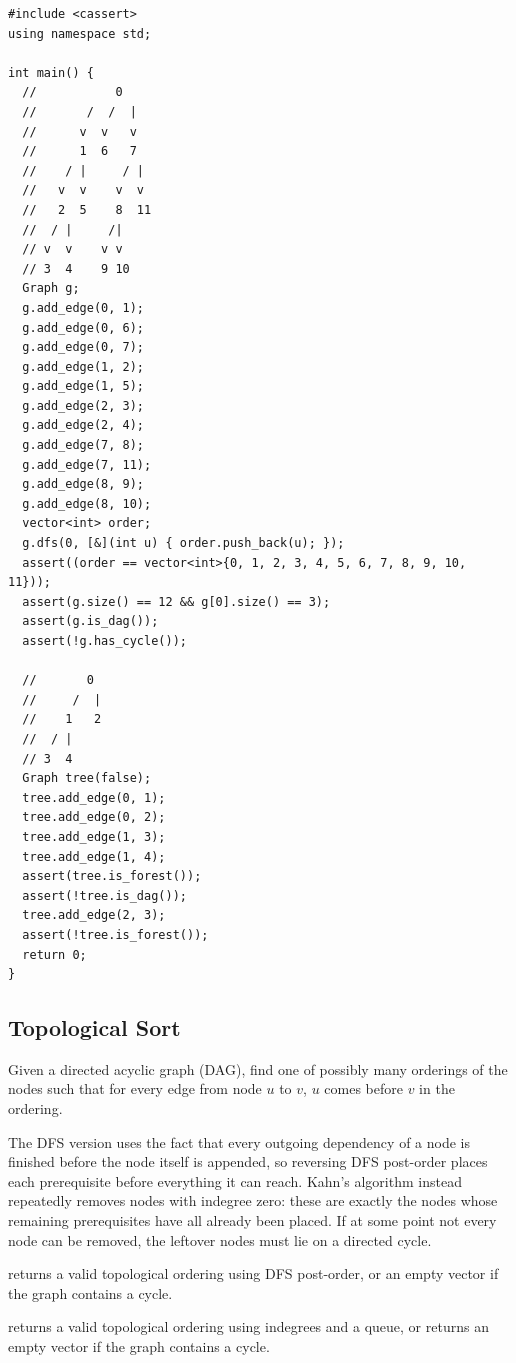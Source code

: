 \begin{lstlisting}[style=cpp]
#include <cassert>
using namespace std;

int main() {
  //           0
  //       /  /  |
  //      v  v   v
  //      1  6   7
  //    / |     / |
  //   v  v    v  v
  //   2  5    8  11
  //  / |     /|
  // v  v    v v
  // 3  4    9 10
  Graph g;
  g.add_edge(0, 1);
  g.add_edge(0, 6);
  g.add_edge(0, 7);
  g.add_edge(1, 2);
  g.add_edge(1, 5);
  g.add_edge(2, 3);
  g.add_edge(2, 4);
  g.add_edge(7, 8);
  g.add_edge(7, 11);
  g.add_edge(8, 9);
  g.add_edge(8, 10);
  vector<int> order;
  g.dfs(0, [&](int u) { order.push_back(u); });
  assert((order == vector<int>{0, 1, 2, 3, 4, 5, 6, 7, 8, 9, 10, 11}));
  assert(g.size() == 12 && g[0].size() == 3);
  assert(g.is_dag());
  assert(!g.has_cycle());

  //       0
  //     /  |
  //    1   2
  //  / |
  // 3  4
  Graph tree(false);
  tree.add_edge(0, 1);
  tree.add_edge(0, 2);
  tree.add_edge(1, 3);
  tree.add_edge(1, 4);
  assert(tree.is_forest());
  assert(!tree.is_dag());
  tree.add_edge(2, 3);
  assert(!tree.is_forest());
  return 0;
}
\end{lstlisting}
\subsection{Topological Sort}
\label{sec:4.1.2}
Given a directed acyclic graph (DAG), find one of possibly many orderings of the nodes such that for every edge from node $u$ to $v$, $u$ comes before $v$ in the ordering.

The DFS version uses the fact that every outgoing dependency of a node is finished before the node itself is appended, so reversing DFS post-order places each prerequisite before everything it can reach. Kahn's algorithm instead repeatedly removes nodes with indegree zero: these are exactly the nodes whose remaining prerequisites have all already been placed. If at some point not every node can be removed, the leftover nodes must lie on a directed cycle.

\begin{compactitem}
  \item {} returns a valid topological ordering using DFS post-order, or an empty vector if the graph contains a cycle.
  \item {} returns a valid topological ordering using indegrees and a queue, or returns an empty vector if the graph contains a cycle.
\end{compactitem}

